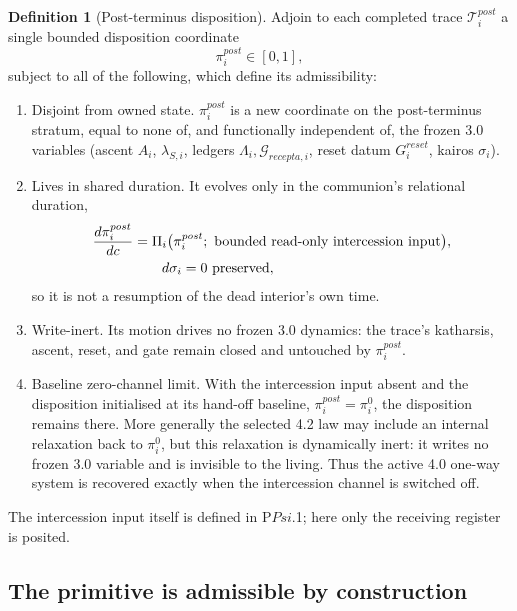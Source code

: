 \documentclass[11pt,a4paper]{article}
\newcommand{\cint}{\ensuremath{\mathfrak c}}
\def\Psi{Psi}%
\def\mathfrak#1{#1}%
\def\mathrm#1{#1}%
\def\emph#1{#1}%
\theoremstyle{definition}
\newtheorem{definition}{Definition}[section]
\theoremstyle{plain}
\theoremstyle{remark}
\begin{document}
\begin{definition}[Post-terminus disposition]\label{def:postdisp}
Adjoin to each completed trace \(\mathcal T_i^{\mathrm{post}}\) a single bounded
\emph{disposition} coordinate
\[
\boxed{\;
\pi_i^{\mathrm{post}}\in[0,1],
\;}
\]
subject to all of the following, which define its admissibility:
\begin{enumerate}[label=\textup{(\alph*)},leftmargin=1.2cm]
\item \emph{Disjoint from owned state.} \(\pi_i^{\mathrm{post}}\) is a new coordinate on the
post-terminus stratum, equal to none of, and functionally independent of, the frozen 3.0
variables (ascent \(A_i\), \(\lambda_{S,i}\), ledgers \(\Lambda_i,\mathcal G_{\mathrm{recepta},i}\),
reset datum \(G_i^{\mathrm{reset}}\), kairos \(\sigma_i\)).
\item \emph{Lives in shared duration.} It evolves only in the communion's relational duration,
\[
\begin{aligned}
\frac{d\pi_i^{\mathrm{post}}}{d\cint}
&=
\Pi_i\bigl(\pi_i^{\mathrm{post}};\ \text{bounded read-only intercession input}\bigr),\\
&\hphantom{={}}\quad d\sigma_i=0\ \text{preserved},
\end{aligned}
\]
so it is not a resumption of the dead interior's own time.
\item \emph{Write-inert.} Its motion drives no frozen 3.0 dynamics: the trace's katharsis,
ascent, reset, and gate remain closed and untouched by \(\pi_i^{\mathrm{post}}\).
\item \emph{Baseline zero-channel limit.} With the intercession input absent and the
disposition initialised at its hand-off baseline, \(\pi_i^{\mathrm{post}}=\pi_i^0\), the
disposition remains there. More generally the selected 4.2 law may include an internal
relaxation back to \(\pi_i^0\), but this relaxation is dynamically inert: it writes no frozen
3.0 variable and is invisible to the living. Thus the active 4.0 one-way system is recovered
exactly when the intercession channel is switched off.
\end{enumerate}
The intercession input itself is defined in P$\Psi$.1; here only the receiving register is
posited.
\end{definition}

\subsection{The primitive is admissible by construction}
\end{document}
